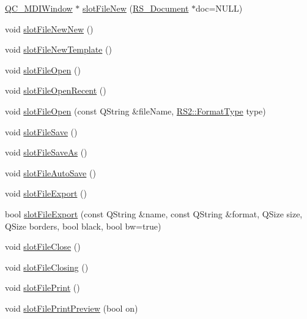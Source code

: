 \begin{DoxyCompactItemize}
\item 
\hyperlink{classQC__MDIWindow}{Q\-C\-\_\-\-M\-D\-I\-Window} $\ast$ \hyperlink{classQC__ApplicationWindow_ac603c086e5fac3b22d59d57b0e5497d9}{slot\-File\-New} (\hyperlink{classRS__Document}{R\-S\-\_\-\-Document} $\ast$doc=N\-U\-L\-L)
\item 
void \hyperlink{classQC__ApplicationWindow_a784d452fd513320198f85d673d5e75ac}{slot\-File\-New\-New} ()
\item 
void \hyperlink{classQC__ApplicationWindow_a4685f2743bc6422a5ed385c6d21d1e2d}{slot\-File\-New\-Template} ()
\item 
void \hyperlink{classQC__ApplicationWindow_a3cd1417b22042aba0a0768dd6e835b3e}{slot\-File\-Open} ()
\item 
void \hyperlink{classQC__ApplicationWindow_af1607a099521eb956539d8808740682a}{slot\-File\-Open\-Recent} ()
\item 
void \hyperlink{classQC__ApplicationWindow_a58980f308617a367c5db1483e0303e15}{slot\-File\-Open} (const Q\-String \&file\-Name, \hyperlink{classRS2_a077a6c94c9a0ab9962c4d4a612c7189b}{R\-S2\-::\-Format\-Type} type)
\item 
void \hyperlink{classQC__ApplicationWindow_a0819d25971905aed9f2921788bc0ae67}{slot\-File\-Save} ()
\item 
void \hyperlink{classQC__ApplicationWindow_aea38788e0a71260ef35dc3d633ff114d}{slot\-File\-Save\-As} ()
\item 
void \hyperlink{classQC__ApplicationWindow_aa76885a6541b43ad351801c294352a15}{slot\-File\-Auto\-Save} ()
\item 
void \hyperlink{classQC__ApplicationWindow_a5123d3276bbc39996c7a985b8294cd60}{slot\-File\-Export} ()
\item 
bool \hyperlink{classQC__ApplicationWindow_a9de454f44146a3310b6a28392a2930cd}{slot\-File\-Export} (const Q\-String \&name, const Q\-String \&format, Q\-Size size, Q\-Size borders, bool black, bool bw=true)
\item 
void \hyperlink{classQC__ApplicationWindow_ac62602efb0942d33431dd04f73223f8a}{slot\-File\-Close} ()
\item 
void \hyperlink{classQC__ApplicationWindow_aa565ad294d14bbb3580e24775daa0598}{slot\-File\-Closing} ()
\item 
void \hyperlink{classQC__ApplicationWindow_a463ca9d22a931d29059959ddfaffc380}{slot\-File\-Print} ()
\item 
void \hyperlink{classQC__ApplicationWindow_a815b7005ebd17f9fbbbd00f229671193}{slot\-File\-Print\-Preview} (bool on)
\item 

\end{DoxyCompactItemize}
